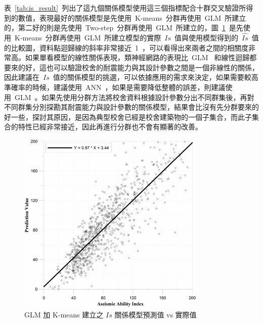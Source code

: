 

表~\ref{tab:is_result}~列出了這九個關係模型使用這三個指標配合十群交叉驗證所得到的數值，表現最好的關係模型是先使用~K-means~分群再使用~GLM~所建立的，第二好的則是先使用~Two-step~分群再使用~GLM~所建立的，圖~\ref{fig:spss-is}~是先使用~K-means~分群再使用~GLM~所建立模型的實際~$Is$~值與使用模型得到的~$\hat{Is}$~值的比較圖，資料點迴歸線的斜率非常接近~1~，可以看得出來兩者之間的相關度非常高。如果單看模型的線性關係表現，類神經網路的表現比~GLM~ 和線性迴歸都要來的好，這也可以驗證校舍的耐震能力與其設計參數之間是一個非線性的關係，因此建議在~$Is$~值的關係模型的挑選，可以依據應用的需求來決定，如果需要較高準確率的時候，建議使用~ANN~，如果是需要降低整體的誤差，則建議使用~GLM~。如果先使用分群方法將校舍資料根據設計參數分出不同群集後，再對不同群集分別探勘其耐震能力與設計參數的關係模型，結果會比沒有先分群要來的好一些，探討其原因，是因為典型校舍已經是校舍建築物的一個子集合，而此子集合的特性已經非常接近，因此再進行分群也不會有顯著的改善。

\begin{figure}[hbtp]
  \begin{center}
    \includegraphics[width=0.8\textwidth]{figures/is-glm.png}
    \caption{GLM 加 K-means 建立之 $Is$ 關係模型預測值 vs 實際值} 
    \label{fig:spss-is}
  \end{center}
\end{figure}


